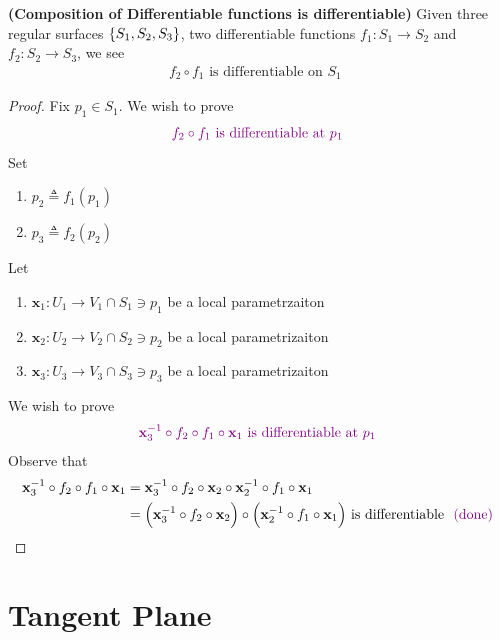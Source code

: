 \documentclass{report}
\begin{document}
\begin{mdframed}

\end{mdframed}
\begin{theorem}
\label{CoD}
\textbf{(Composition of Differentiable functions is differentiable)} Given three regular surfaces $\{ S_1,S_2,S_3 \}$, two differentiable functions $f_1:S_1\rightarrow S_2$ and $f_2:S_2\rightarrow S_3$, we see 
\begin{align*}
f_2\circ f_1\text{ is differentiable on $S_1$ }
\end{align*}
\end{theorem}
\begin{proof}
Fix $p_1\in S_1 $. We wish to prove 
\begin{align*}
  \textcolor{violet}{f_2\circ f_1\text{ is differentiable at $p_1$ }}
\end{align*}
Set 
\begin{enumerate}[label=(\alph*)]
  \item $p_2\triangleq f_1(p_1)$ 
  \item $p_3\triangleq f_2(p_2)$
\end{enumerate}
Let 
\begin{enumerate}[label=(\alph*)]
  \item $\textbf{x}_1:U_1 \rightarrow V_1\cap S_1 \ni p_1 $ be a local parametrzaiton 
   \item $\textbf{x}_2:U_2\rightarrow V_2\cap S_2\ni p_2$ be a local parametrizaiton 
    \item $\textbf{x}_3:U_3\rightarrow V_3\cap S_3\ni p_3$ be a local parametrizaiton 
\end{enumerate}
We wish to prove 
\begin{align*}
  \textcolor{violet}{\textbf{x}_3^{-1}\circ f_2\circ f_1 \circ \textbf{x}_1\text{ is differentiable at $p_1$ }}
\end{align*}
Observe that 
\begin{align*}
\textbf{x}_3^{-1}\circ f_2\circ f_1\circ \textbf{x}_1&=\textbf{x}_3^{-1}\circ f_2 \circ \textbf{x}_2 \circ \textbf{x}_2^{-1} \circ f_1 \circ \textbf{x}_1\\
&=\Big(\textbf{x}_3^{-1}\circ f_2\circ \textbf{x}_2 \Big)\circ \Big(\textbf{x}_2^{-1}\circ f_1\circ \textbf{x}_1 \Big)\text{ is differentiable $\textcolor{violet}{\text{ (done) }}$}
\end{align*}
\end{proof}

\section{Tangent Plane}
\end{document}
